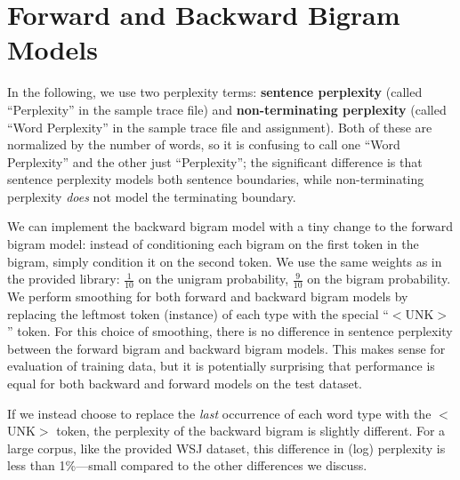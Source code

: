 \documentclass[10pt]{article}
\begin{document}


\section{Forward and Backward Bigram Models}


In the following, we use two perplexity terms: \textbf{sentence perplexity} (called ``Perplexity'' in the sample trace file) and \textbf{non-terminating perplexity} (called ``Word Perplexity'' in the sample trace file and assignment). Both of these are normalized by the number of words, so it is confusing to call one ``Word Perplexity'' and the other just ``Perplexity''; the significant difference is that sentence perplexity models both sentence boundaries, while non-terminating perplexity \emph{does} not model the terminating boundary.

We can implement the backward bigram model with a tiny change to the forward bigram model: instead of conditioning each bigram on the first token in the bigram, simply condition it on the second token.
We use the same weights as in the provided library: $\frac{1}{10}$ on the unigram probability, $\frac{9}{10}$ on the bigram probability.
We perform smoothing for both forward and backward bigram models by replacing the leftmost token (instance) of each type with the special ``$<$UNK$>$'' token. For this choice of smoothing, there is no difference in sentence perplexity between the forward bigram and backward bigram models. This makes sense for evaluation of training data, but it is potentially surprising that performance is equal for both backward and forward models on the test dataset.

If we instead choose to replace the \emph{last} occurrence of each word type with the $<$UNK$>$ token, the perplexity of the backward bigram is slightly different. For a large corpus, like the provided WSJ dataset, this difference in (log) perplexity is less than 1\%---small compared to the other differences we discuss.
\end{document}
